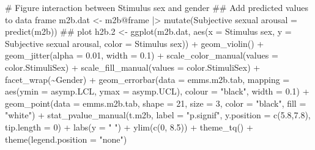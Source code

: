 \documentclass[
  bookmarksnumbered]{article}
\newenvironment{Shaded}{\begin{snugshade}}{\end{snugshade}}
\newcommand{\AttributeTok}[1]{\textcolor[rgb]{0.80,0.80,0.80}{#1}}
\newcommand{\CommentTok}[1]{\textcolor[rgb]{0.50,0.62,0.50}{#1}}
\newcommand{\DecValTok}[1]{\textcolor[rgb]{0.86,0.86,0.80}{#1}}
\newcommand{\DocumentationTok}[1]{\textcolor[rgb]{0.50,0.62,0.50}{#1}}
\newcommand{\FloatTok}[1]{\textcolor[rgb]{0.75,0.75,0.82}{#1}}
\newcommand{\FunctionTok}[1]{\textcolor[rgb]{0.94,0.94,0.56}{#1}}
\newcommand{\NormalTok}[1]{\textcolor[rgb]{0.80,0.80,0.80}{#1}}
\newcommand{\OtherTok}[1]{\textcolor[rgb]{0.94,0.94,0.56}{#1}}
\newcommand{\SpecialCharTok}[1]{\textcolor[rgb]{0.86,0.64,0.64}{#1}}
\newcommand{\StringTok}[1]{\textcolor[rgb]{0.80,0.58,0.58}{#1}}
\begin{document}
\begin{Shaded}
\begin{Highlighting}[]
\CommentTok{\# Figure interaction between Stimulus sex and gender}
\DocumentationTok{\#\# Add predicted values to data frame}
\NormalTok{m2b.dat }\OtherTok{\textless{}{-}}\NormalTok{ m2b}\SpecialCharTok{@}\NormalTok{frame }\SpecialCharTok{|\textgreater{}} 
  \FunctionTok{mutate}\NormalTok{(}\StringTok{\textasciigrave{}}\AttributeTok{Subjective sexual arousal}\StringTok{\textasciigrave{}} \OtherTok{=} \FunctionTok{predict}\NormalTok{(m2b))}
\DocumentationTok{\#\# plot}
\NormalTok{h2b}\FloatTok{.2} \OtherTok{\textless{}{-}} \FunctionTok{ggplot}\NormalTok{(m2b.dat, }\FunctionTok{aes}\NormalTok{(}\AttributeTok{x =} \StringTok{\textasciigrave{}}\AttributeTok{Stimulus sex}\StringTok{\textasciigrave{}}\NormalTok{, }
                             \AttributeTok{y =} \StringTok{\textasciigrave{}}\AttributeTok{Subjective sexual arousal}\StringTok{\textasciigrave{}}\NormalTok{, }
                             \AttributeTok{color =} \StringTok{\textasciigrave{}}\AttributeTok{Stimulus sex}\StringTok{\textasciigrave{}}\NormalTok{)) }\SpecialCharTok{+}
  \FunctionTok{geom\_violin}\NormalTok{() }\SpecialCharTok{+}
  \FunctionTok{geom\_jitter}\NormalTok{(}\AttributeTok{alpha =} \FloatTok{0.01}\NormalTok{, }\AttributeTok{width =} \FloatTok{0.1}\NormalTok{) }\SpecialCharTok{+}
  \FunctionTok{scale\_color\_manual}\NormalTok{(}\AttributeTok{values =}\NormalTok{ color.StimuliSex) }\SpecialCharTok{+}
  \FunctionTok{scale\_fill\_manual}\NormalTok{(}\AttributeTok{values =}\NormalTok{ color.StimuliSex) }\SpecialCharTok{+}
  \FunctionTok{facet\_wrap}\NormalTok{(}\SpecialCharTok{\textasciitilde{}}\NormalTok{Gender) }\SpecialCharTok{+}
  \FunctionTok{geom\_errorbar}\NormalTok{(}\AttributeTok{data =}\NormalTok{ emms.m2b.tab, }
                \AttributeTok{mapping =} \FunctionTok{aes}\NormalTok{(}\AttributeTok{ymin =}\NormalTok{ asymp.LCL, }\AttributeTok{ymax =}\NormalTok{ asymp.UCL), }
                \AttributeTok{colour =} \StringTok{"black"}\NormalTok{, }\AttributeTok{width =} \FloatTok{0.1}\NormalTok{) }\SpecialCharTok{+}
  \FunctionTok{geom\_point}\NormalTok{(}\AttributeTok{data =}\NormalTok{ emms.m2b.tab, }
             \AttributeTok{shape =} \DecValTok{21}\NormalTok{, }\AttributeTok{size =} \DecValTok{3}\NormalTok{,}
             \AttributeTok{color =} \StringTok{"black"}\NormalTok{, }\AttributeTok{fill =} \StringTok{"white"}\NormalTok{) }\SpecialCharTok{+}
  \FunctionTok{stat\_pvalue\_manual}\NormalTok{(t.m2b, }
                     \AttributeTok{label =} \StringTok{"p.signif"}\NormalTok{, }
                     \AttributeTok{y.position =} \FunctionTok{c}\NormalTok{(}\FloatTok{5.8}\NormalTok{,}\FloatTok{7.8}\NormalTok{), }
                     \AttributeTok{tip.length =} \DecValTok{0}\NormalTok{) }\SpecialCharTok{+}
  \FunctionTok{labs}\NormalTok{(}\AttributeTok{y =} \StringTok{" "}\NormalTok{) }\SpecialCharTok{+}
  \FunctionTok{ylim}\NormalTok{(}\FunctionTok{c}\NormalTok{(}\DecValTok{0}\NormalTok{, }\FloatTok{8.5}\NormalTok{)) }\SpecialCharTok{+}
  \FunctionTok{theme\_tq}\NormalTok{() }\SpecialCharTok{+}
  \FunctionTok{theme}\NormalTok{(}\AttributeTok{legend.position =} \StringTok{"none"}\NormalTok{)}


\end{Highlighting}
\end{Shaded}
\end{document}
